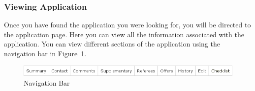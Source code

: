 \documentclass[titlepage]{article}
\begin{document}
\subsubsection{Viewing Application}
Once you have found the application you were looking for, you will be directed
to the application page.  Here you can view all the information associated
with the application.  You can view different sections of the application
using the navigation bar in Figure~\ref{mApptabs}.

\begin{figure}[h!]
  \begin{center}
  \includegraphics[width=13cm]{apptabs.png}
  \end{center}
  \caption{Navigation Bar}
  \label{mApptabs}
\end{figure}
\end{document}
